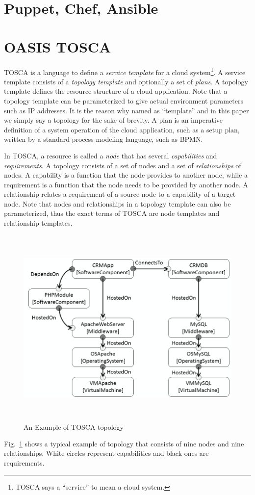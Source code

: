 \documentclass[12pt]{report}
\begin{document}
\section{Puppet, Chef, Ansible}
\label{sec:PCA}

\section{OASIS TOSCA}
\label{sec:TOSCA}
TOSCA is a language to define a {\it service template} for a cloud
system\footnote{TOSCA says a ``service'' to mean a cloud system.}. A
service template consists of a {\it topology template} and optionally
a set of {\it plans}. A topology template defines the resource
structure of a cloud application. Note that a topology template can be
parameterized to give actual environment parameters such as IP
addresses. It is the reason why named as ``template'' and in this
paper we simply say a topology for the sake of brevity. A plan is an
imperative definition of a system operation of the cloud application,
such as a setup plan, written by a standard process modeling language,
such as BPMN.

In TOSCA, a resource is called a {\it node} that has several {\it
  capabilities} and {\it requirements}. A topology consists of a set
of nodes and a set of {\it relationships} of nodes.  A capability is a
function that the node provides to another node, while a requirement
is a function that the node needs to be provided by another node. A
relationship relates a requirement of a source node to a capability of
a target node. Note that nodes and relationships in a topology
template can also be parameterized, thus the exact terms of TOSCA are
node templates and relationship templates.
\begin{figure}
\centering
\includegraphics[height=10cm,natwidth=640,natheight=429]{./extopology.png}
\caption{An Example of TOSCA topology}
\label{fig:exampletopology}
\end{figure}
Fig.~\ref{fig:exampletopology} shows a typical example of topology
that consists of nine nodes and nine relationships. White circles
represent capabilities and black ones are requirements.
\end{document}

